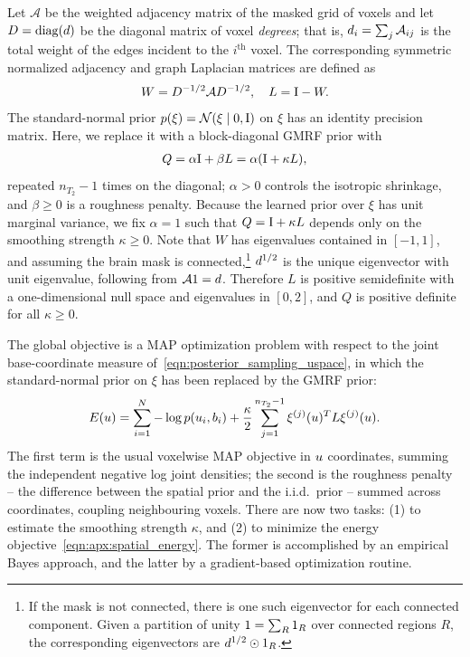 Let $\mathcal{A}$ be the weighted adjacency matrix of the masked grid of voxels and let $D = \Diag{\vv{d}}$ be the diagonal matrix of voxel \textit{degrees};
that is, $d_i = \sum_j \mathcal{A}_{ij}$ is the total weight of the edges incident to the $i^\text{th}$ voxel.
The corresponding symmetric normalized adjacency and graph Laplacian matrices are defined as
\begin{align}\label{eqn:apx:spatial_laplacian}
    W = D^{-1/2} \mathcal{A} D^{-1/2}, \quad L = \mathrm{I} - W.
\end{align}
The standard-normal prior $p(\xi) = \mathcal{N}(\xi \mid \mathrm{0}, \mathrm{I})$ on $\xi$ has an identity precision matrix.
Here, we replace it with a block-diagonal \gls*{GMRF} prior with
\begin{align}\label{eqn:apx:spatial_precision}
    Q = \alpha \mathrm{I} + \beta L = \alpha (\mathrm{I} + \kappa L),
\end{align}
repeated $n_{T_2} - 1$ times on the diagonal;
$\alpha > 0$ controls the isotropic shrinkage, and $\beta \ge 0$ is a roughness penalty.
Because the learned prior over $\xi$ has unit marginal variance, we fix $\alpha = 1$ such that $Q = \mathrm{I} + \kappa L$ depends only on the smoothing strength $\kappa \ge 0$.
Note that $W$ has eigenvalues contained in $[-1, 1]$, and assuming the brain mask is connected,\footnote{If the mask is not connected, there is one such eigenvector for each connected component. Given a partition of unity $\mathrm{1} = \sum_R \mathrm{1}_R$ over connected regions $R$, the corresponding eigenvectors are $d^{1/2} \odot \mathrm{1}_R$.}
$d^{1/2}$ is the unique eigenvector with unit eigenvalue, following from $\mathcal{A} \mathrm{1} = d$.
Therefore $L$ is positive semidefinite with a one-dimensional null space and eigenvalues in $[0, 2]$, and $Q$ is positive definite for all $\kappa \ge 0$.

The global objective is a \gls*{MAP} optimization problem with respect to the joint base-coordinate measure of~\eqref{eqn:posterior_sampling_uspace}, in which the standard-normal prior on $\xi$ has been replaced by the \gls*{GMRF} prior:
\begin{align}\label{eqn:apx:spatial_energy}
    E(u)
    =
    \sum_{i = 1}^N -\log p(u_i, b_i)
    + \frac{\kappa}{2} \sum_{j=1}^{n_{T_2}-1} \xi^{(j)}(u)^T L \xi^{(j)}(u).
\end{align}
The first term is the usual voxelwise \gls*{MAP} objective in $u$ coordinates, summing the independent negative log joint densities;
the second is the roughness penalty -- the difference between the spatial prior and the i.i.d.\ prior -- summed across coordinates, coupling neighbouring voxels.
There are now two tasks:
(1) to estimate the smoothing strength $\kappa$, and
(2) to minimize the energy objective~\eqref{eqn:apx:spatial_energy}.
The former is accomplished by an empirical Bayes approach, and the latter by a gradient-based optimization routine.

